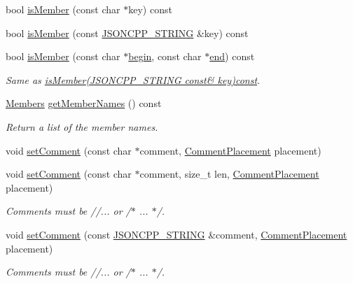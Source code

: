 \begin{DoxyCompactItemize}
bool \hyperlink{class_json_1_1_value_ad6d4df2227321bab05e86667609a7fad}{is\+Member} (const char $\ast$key) const
\item 
bool \hyperlink{class_json_1_1_value_a0c2cd838217b23ee6bde8135de1b30d9}{is\+Member} (const \hyperlink{json_8h_a1e723f95759de062585bc4a8fd3fa4be}{J\+S\+O\+N\+C\+P\+P\+\_\+\+S\+T\+R\+I\+NG} \&key) const
\item 
bool \hyperlink{class_json_1_1_value_a2007e1e51f21f44ecf1f13e4a1c567b9}{is\+Member} (const char $\ast$\hyperlink{class_json_1_1_value_a015459a3950c198d63a2d3be8f5ae296}{begin}, const char $\ast$\hyperlink{class_json_1_1_value_a3e443cd0ef24f7e028b175e47ee045e0}{end}) const
\begin{DoxyCompactList}\small\item\em Same as \hyperlink{class_json_1_1_value_a0c2cd838217b23ee6bde8135de1b30d9}{is\+Member(\+J\+S\+O\+N\+C\+P\+P\+\_\+\+S\+T\+R\+I\+N\+G const\& key)const}. \end{DoxyCompactList}\item 
\hyperlink{class_json_1_1_value_a9ae9069983fc38f1928d76f9c79ac64d}{Members} \hyperlink{class_json_1_1_value_a79d7725dce6260317333e69022367ac9}{get\+Member\+Names} () const
\begin{DoxyCompactList}\small\item\em Return a list of the member names. \end{DoxyCompactList}\item 
void \hyperlink{class_json_1_1_value_a29f3a30f7e5d3af6f38d57999bf5b480}{set\+Comment} (const char $\ast$comment, \hyperlink{namespace_json_a4fc417c23905b2ae9e2c47d197a45351}{Comment\+Placement} placement)
\item 
void \hyperlink{class_json_1_1_value_a2900152a2887b410a9ddabe278b9d492}{set\+Comment} (const char $\ast$comment, size\+\_\+t len, \hyperlink{namespace_json_a4fc417c23905b2ae9e2c47d197a45351}{Comment\+Placement} placement)
\begin{DoxyCompactList}\small\item\em Comments must be //... or /$\ast$ ... $\ast$/. \end{DoxyCompactList}\item 
void \hyperlink{class_json_1_1_value_a2c5d13a5f45eb77e912008778e65b27f}{set\+Comment} (const \hyperlink{json_8h_a1e723f95759de062585bc4a8fd3fa4be}{J\+S\+O\+N\+C\+P\+P\+\_\+\+S\+T\+R\+I\+NG} \&comment, \hyperlink{namespace_json_a4fc417c23905b2ae9e2c47d197a45351}{Comment\+Placement} placement)
\begin{DoxyCompactList}\small\item\em Comments must be //... or /$\ast$ ... $\ast$/. \end{DoxyCompactList}\item 

\end{DoxyCompactItemize}
